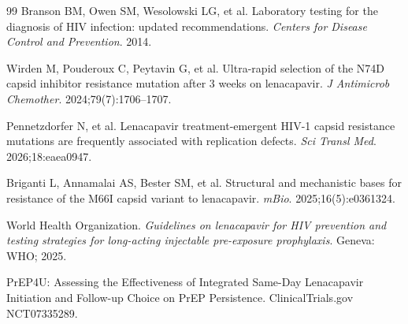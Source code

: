 \documentclass[11pt]{article}
\begin{document}
\begin{thebibliography}{99}
 Branson BM, Owen SM, Wesolowski LG, et al. Laboratory testing for the diagnosis of HIV infection: updated recommendations. \emph{Centers for Disease Control and Prevention}. 2014.

 Wirden M, Pouderoux C, Peytavin G, et al. Ultra-rapid selection of the N74D capsid inhibitor resistance mutation after 3 weeks on lenacapavir. \emph{J Antimicrob Chemother}. 2024;79(7):1706--1707.

 Pennetzdorfer N, et al. Lenacapavir treatment-emergent HIV-1 capsid resistance mutations are frequently associated with replication defects. \emph{Sci Transl Med}. 2026;18:eaea0947.

 Briganti L, Annamalai AS, Bester SM, et al. Structural and mechanistic bases for resistance of the M66I capsid variant to lenacapavir. \emph{mBio}. 2025;16(5):e0361324.

 World Health Organization. \emph{Guidelines on lenacapavir for HIV prevention and testing strategies for long-acting injectable pre-exposure prophylaxis}. Geneva: WHO; 2025.

 PrEP4U: Assessing the Effectiveness of Integrated Same-Day Lenacapavir Initiation and Follow-up Choice on PrEP Persistence. ClinicalTrials.gov NCT07335289.
\end{thebibliography}
\end{document}
